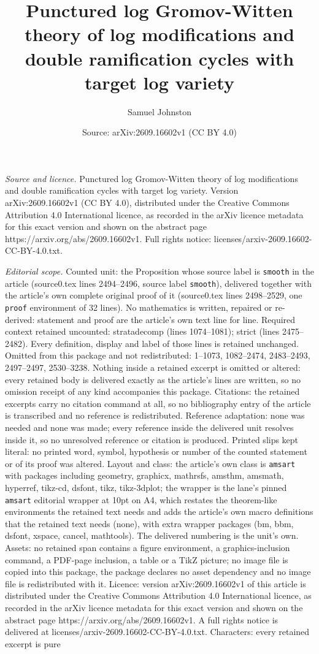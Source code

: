 \documentclass[10pt,a4paper]{amsart}
\title[Punctured log Gromov-Witten theory of log modifications and ]{Punctured log Gromov-Witten theory of log modifications and double ramification cycles with target log variety}
\author{Samuel Johnston}
\date{Source: arXiv:2609.16602v1 (CC BY 4.0)}
\begin{document}
\maketitle

\noindent\emph{Source and licence.} Punctured log Gromov-Witten theory of log modifications and double ramification cycles with target log variety. Version arXiv:2609.16602v1 (CC BY 4.0), distributed under the Creative Commons Attribution 4.0 International licence, as recorded in the arXiv licence metadata for this exact version and shown on the abstract page https://arxiv.org/abs/2609.16602v1. Full rights notice: licenses/arxiv-2609.16602-CC-BY-4.0.txt.\par\smallskip

\noindent\textit{Editorial scope.} Counted unit: the Proposition whose source label is \texttt{smooth} in the article (source0.tex lines 2494--2496, source label \texttt{smooth}), delivered together with the article's own complete original proof of it (source0.tex lines 2498--2529, one \texttt{proof} environment of 32 lines). No mathematics is written, repaired or re-derived: statement and proof are the article's own text line for line. Required context retained uncounted: stratadecomp (lines 1074--1081); strict (lines 2475--2482). Every definition, display and label of those lines is retained unchanged. Omitted from this package and not redistributed: 1--1073, 1082--2474, 2483--2493, 2497--2497, 2530--3238. Nothing inside a retained excerpt is omitted or altered: every retained body is delivered exactly as the article's lines are written, so no omission receipt of any kind accompanies this package. Citations: the retained excerpts carry no citation command at all, so no bibliography entry of the article is transcribed and no reference is redistributed. Reference adaptation: none was needed and none was made; every reference inside the delivered unit resolves inside it, so no unresolved reference or citation is produced. Printed slips kept literal: no printed word, symbol, hypothesis or number of the counted statement or of its proof was altered. Layout and class: the article's own class is \texttt{amsart} with packages including geometry, graphicx, mathrsfs, amsthm, amsmath, hyperref, tikz-cd, dsfont, tikz, tikz-3dplot; the wrapper is the lane's pinned \texttt{amsart} editorial wrapper at 10pt on A4, which restates the theorem-like environments the retained text needs and adds the article's own macro definitions that the retained text needs (none), with extra wrapper packages (bm, bbm, dsfont, xspace, cancel, mathtools). The delivered numbering is the unit's own. Assets: no retained span contains a figure environment, a graphics-inclusion command, a PDF-page inclusion, a table or a TikZ picture; no image file is copied into this package, the package declares no asset dependency and no image file is redistributed with it. Licence: version arXiv:2609.16602v1 of this article is distributed under the Creative Commons Attribution 4.0 International licence, as recorded in the arXiv licence metadata for this exact version and shown on the abstract page https://arxiv.org/abs/2609.16602v1. A full rights notice is delivered at licenses/arxiv-2609.16602-CC-BY-4.0.txt. Characters: every retained excerpt is pure 
\end{document}
